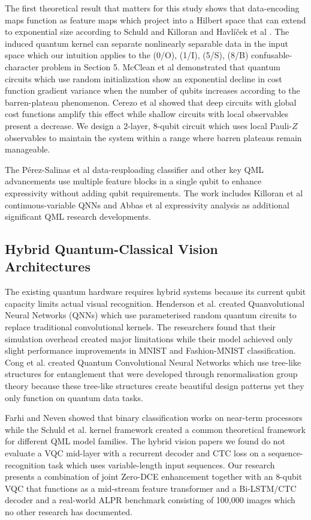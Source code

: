\documentclass[preprint,12pt]{elsarticle}
\begin{document}
The first theoretical result that matters for this study shows that data-encoding maps function as feature maps which project into a Hilbert space that can extend to exponential size according to Schuld and Killoran \cite{b35} and Havlíček et al \cite{b26}. The induced quantum kernel can separate nonlinearly separable data in the input space which our intuition applies to the (0/O), (1/I), (5/S), (8/B) confusable-character problem in Section 5. McClean et al \cite{b4} demonstrated that quantum circuits which use random initialization show an exponential decline in cost function gradient variance when the number of qubits increases according to the barren-plateau phenomenon. Cerezo et al \cite{b38} showed that deep circuits with global cost functions amplify this effect while shallow circuits with local observables present a decrease. We design a 2-layer, 8-qubit circuit which uses local Pauli-$Z$ observables to maintain the system within a range where barren plateaus remain manageable.

The Pérez-Salinas et al \cite{b40} data-reuploading classifier and other key QML advancements use multiple feature blocks in a single qubit to enhance expressivity without adding qubit requirements. The work includes Killoran et al \cite{b39} continuous-variable QNNs and Abbas et al \cite{b29} expressivity analysis as additional significant QML research developments.

\subsection{Hybrid Quantum-Classical Vision Architectures}
The existing quantum hardware requires hybrid systems because its current qubit capacity limits actual visual recognition. Henderson et al. \cite{b11} created Quanvolutional Neural Networks (QNNs) which use parameterised random quantum circuits to replace traditional convolutional kernels. The researchers found that their simulation overhead created major limitations while their model achieved only slight performance improvements in MNIST and Fashion-MNIST classification. Cong et al. \cite{b27} created Quantum Convolutional Neural Networks which use tree-like structures for entanglement that were developed through renormalisation group theory because these tree-like structures create beautiful design patterns yet they only function on quantum data tasks.

Farhi and Neven \cite{b28} showed that binary classification works on near-term processors while the Schuld et al. \cite{b5} kernel framework created a common theoretical framework for different QML model families. The hybrid vision papers we found do not evaluate a VQC mid-layer with a recurrent decoder and CTC loss on a sequence-recognition task which uses variable-length input sequences. Our research presents a combination of joint Zero-DCE enhancement together with an 8-qubit VQC that functions as a mid-stream feature transformer and a Bi-LSTM/CTC decoder and a real-world ALPR benchmark consisting of 100,000 images which no other research has documented.
\end{document}
